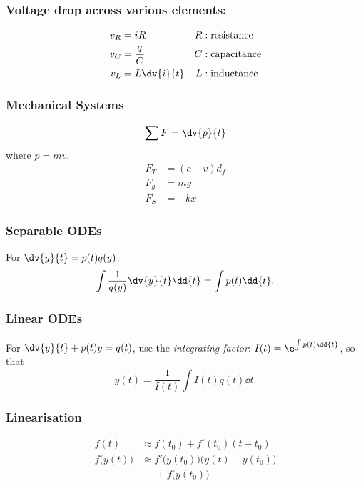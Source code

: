 \documentclass{article}
\begin{document}
\begin{multicols}{3}
    \subsubsection*{Voltage drop across various elements:}
    \begin{align*}
        v_R & = iR          & R & : \text{resistance}  \\
        v_C & = \frac{q}{C} & C & : \text{capacitance} \\
        v_L & = L \dv{i}{t} & L & : \text{inductance}
    \end{align*}
    \subsubsection*{Mechanical Systems}
    \begin{equation*}
        \sum F = \dv{p}{t}
    \end{equation*}
    where $p = mv$.
    \begin{align*}
        F_T & = \left( c - v \right) d_f \\
        F_g & = mg                       \\
        F_S & = -kx
    \end{align*}
    \subsubsection*{Separable ODEs}
    For $\dv{y}{t} = p(t) q(y)$:
    \begin{equation*}
        \int \frac{1}{q(y)} \dv{y}{t} \dd{t} = \int p(t) \dd{t}.
    \end{equation*}
    \subsubsection*{Linear ODEs}
    For $\dv{y}{t} + p(t)y = q(t)$, use the \textit{integrating factor}:
    $I(t) = \e^{\int p(t) \dd{t}}$, so that
    \begin{equation*}
        y(t) = \frac{1}{I(t)} \int I(t) q(t) \dd{t}.
    \end{equation*}
    \subsubsection*{Linearisation}
    \begin{align*}
        f(t)              & \approx f(t_0) + f'(t_0)(t-t_0)                     \\
        f\bigl(y(t)\bigr) & \approx f'\bigl(y(t_0)\bigr)\bigl(y(t)-y(t_0)\bigr) \\
                          & \phantom{\approx} +f\bigl(y(t_0)\bigr)
    \end{align*}

\end{multicols}
\end{document}
